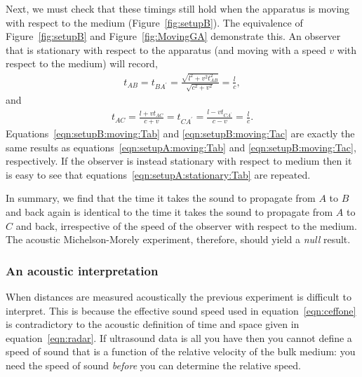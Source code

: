 \documentclass[10pt, fleqn,final,showtrims,oldfontcommands]{article} %
\newcommand{\eqnref}[1]{\ref{eqn:#1}}
\newcommand{\figref}[1]{Figure~\ref{fig:#1}}
\begin{document}
Next, we must check that these timings still hold when the apparatus is moving with respect to the medium (\figref{setupB}).
The equivalence of \figref{setupB} and \figref{MovingGA} demonstrate this.
An observer that is stationary with respect to the apparatus (and moving with a speed $v$ with respect to the medium) will record,
\begin{align}
  \label{eqn:setupB:moving:Tab}
  t_{AB} = t_{BA^\prime} =  \frac{\sqrt{l^2+v^2t_{AB}^2}}{\sqrt{c^2 +v^2}} = \frac{l}{c},
\end{align}
and 
\begin{align}
  \label{eqn:setupB:moving:Tac}
  t_{AC} =  \frac{l+vt_{AC}}{c+v}= t_{CA^\prime} =  \frac{l-vt_{CA^\prime}}{c-v}= \frac{l}{c}.
\end{align}
Equations~\ref{eqn:setupB:moving:Tab} and \ref{eqn:setupB:moving:Tac}  are exactly the same results as equations~\ref{eqn:setupA:moving:Tab} and \ref{eqn:setupB:moving:Tac},
respectively.
If the observer is instead stationary with respect to medium then it is easy to see that equations~\ref{eqn:setupA:stationary:Tab}  are repeated.

In summary, we find that the time it takes the sound to propagate from $A$ to $B$ and back again is
identical to the time it takes the sound to propagate from $A$ to $C$ and back,
irrespective of the speed of the observer with respect to the medium.
The acoustic Michelson-Morely experiment, therefore, should yield a  {\em null} result.
\subsubsection{An acoustic interpretation}\label{sec:MMLorentzian}

When distances are measured acoustically the previous experiment is  difficult to interpret.
This is because the effective sound speed used in equation~\ref{eqn:ceffone}  is contradictory to the acoustic definition of time and space given in equation~\ref{eqn:radar}.
If ultrasound data is all you have then you cannot define a  speed of sound that is a function of the relative velocity of the bulk medium:
you need the speed of sound {\em before} you can determine the relative speed.


\end{document}
